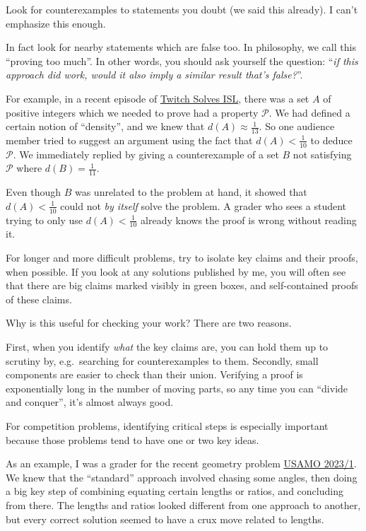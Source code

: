 \documentclass[11pt]{scrartcl}
\begin{document}
\begin{itemize}
  \ii \alert{Look for counterexamples to statements you doubt}
  (we said this already). I can't emphasize this enough.

  \ii In fact \alert{look for nearby statements which are false too}.
  In philosophy, we call this ``proving too much''.
  In other words, you should ask yourself the question:
  ``\emph{if this approach did work,
    would it also imply a similar result that's false?}''.

  For example, in a recent episode of
  \href{https://web.evanchen.cc}{Twitch Solves ISL},
  there was a set $A$ of positive integers
  which we needed to prove had a property $\mathcal{P}$.
  We had defined a certain notion of ``density'',
  and we knew that $d(A) \approx \frac{1}{13}$.
  So one audience member tried to suggest an argument
  using the fact that $d(A) < \frac{1}{10}$ to deduce $\mathcal{P}$.
  We immediately replied by giving a counterexample of a set $B$
  not satisfying $\mathcal{P}$ where $d(B) = \frac{1}{11}$.

  Even though $B$ was unrelated to the problem at hand, it showed that
  $d(A) < \frac{1}{10}$ could not \emph{by itself} solve the problem.
  A grader who sees a student trying to only use $d(A) < \frac{1}{10}$
  already knows the proof is wrong without reading it.

  \ii For longer and more difficult problems,
  try to \alert{isolate key claims and their proofs}, when possible.
  If you look at any solutions published by me,
  you will often see that there are big claims marked visibly in green boxes,
  and self-contained proofs of these claims.

  Why is this useful for checking your work? There are two reasons.
  \begin{itemize}
  \ii First, when you identify \emph{what} the key claims are,
  you can hold them up to scrutiny by, e.g.\
  searching for counterexamples to them.
  \ii Secondly, small components are easier to check than their union.
  Verifying a proof is exponentially long in the number of moving parts,
  so any time you can ``divide and conquer'', it's almost always good.
  \end{itemize}

  \ii For competition problems, identifying critical steps is especially
  important because those problems tend to have one or two key ideas.

  As an example, I was a grader for the recent geometry problem
  \href{https://web.evanchen.cc/exams/USAMO-2023-notes.pdf}{USAMO 2023/1}.
  We knew that the ``standard'' approach involved chasing some angles,
  then doing a big key step of combining equating certain lengths or ratios,
  and concluding from there.
  The lengths and ratios looked different from one approach to another,
  but every correct solution seemed to have a crux move related to lengths.


\end{itemize}
\end{document}
